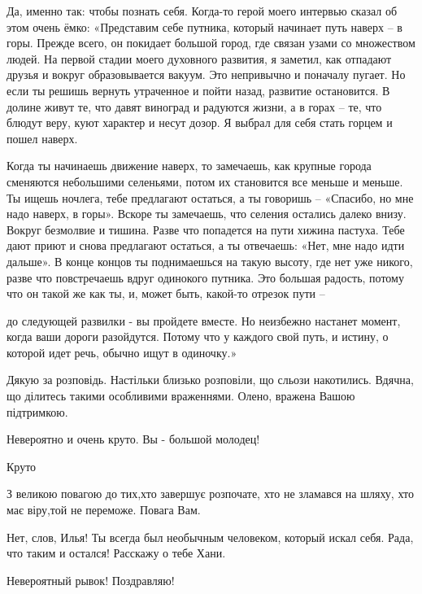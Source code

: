 \begin{itemize}

Да, именно так: чтобы познать себя. Когда-то герой моего интервью сказал об
этом очень ёмко: «Представим себе путника, который начинает путь наверх – в
горы. Прежде всего, он покидает большой город, где связан узами со множеством
людей. На первой стадии моего духовного развития, я заметил, как отпадают
друзья и вокруг образовывается вакуум. Это непривычно и поначалу пугает. Но
если ты решишь вернуть утраченное и пойти назад, развитие остановится. В долине
живут те, что давят виноград и радуются жизни, а в горах – те, что блюдут веру,
куют характер и несут дозор. Я выбрал для себя стать горцем и пошел наверх.

Когда ты начинаешь движение наверх, то замечаешь, как крупные города сменяются
небольшими селеньями, потом их становится все меньше и меньше. Ты ищешь
ночлега, тебе предлагают остаться, а ты говоришь – «Спасибо, но мне надо
наверх, в горы». Вскоре ты замечаешь, что селения остались далеко внизу. Вокруг
безмолвие и тишина. Разве что попадется на пути хижина пастуха. Тебе дают приют
и снова предлагают остаться, а ты отвечаешь: «Нет, мне надо идти дальше». В
конце концов ты поднимаешься на такую высоту, где нет уже никого, разве что
повстречаешь вдруг одинокого путника. Это большая радость, потому что он такой
же как ты, и, может быть, какой-то отрезок пути –

до следующей развилки - вы пройдете вместе. Но неизбежно настанет момент, когда
ваши дороги разойдутся. Потому что у каждого свой путь, и истину, о которой
идет речь, обычно ищут в одиночку.»


Дякую за розповідь. Настільки близько розповіли, що сльози накотились.
Вдячна, що ділитесь такими особливими враженнями.
Олено, вражена Вашою підтримкою.

Невероятно и очень круто. Вы - большой молодец!

Круто

З великою повагою до тих,хто завершує розпочате, хто не зламався на шляху, хто має віру,той не переможе. Повага Вам.

Нет, слов, Илья! Ты всегда был необычным человеком, который искал себя. Рада, что таким и остался! Расскажу о тебе Хани.


Невероятный рывок! Поздравляю!



\end{itemize}
